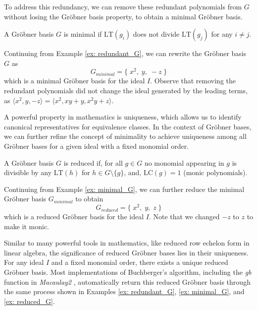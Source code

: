 To address this redundancy, we can remove these redundant polynomials from $G$ without losing the Gröbner basis property, to obtain a minimal Gröbner basis. 

\begin{definition}
\label{def:minimal_grobner_basis}
A Gröbner basis $G$ is minimal if $\text{LT}(g_i)$ does not divide $\text{LT}(g_j)$ for any $i \neq j$.
\end{definition}

\begin{example}
\label{ex: minimal_G}
Continuing from Example \ref{ex: redundant_G}, we can rewrite the Gröbner basis $G$ as
$$G_{minimal} = \Bigg\{ \; x^2, \; y ,\; -z \; \Bigg\}$$
which is a minimal Gröbner basis for the ideal $I$. Observe that removing the redundant polynomials did not change the ideal generated by the leading terms, as $\langle x^2, y, -z \rangle = \langle x^2, xy + y, x^2 y + z \rangle$.
\end{example}

A powerful property in mathematics is uniqueness, which allows us to identify canonical representatives for equivalence classes. In the context of Gröbner bases, we can further refine the concept of minimality to achieve uniqueness among all Gröbner bases for a given ideal with a fixed monomial order.

\begin{definition}
\label{def:reduced_grobner_basis}
A Gröbner basis $G$ is reduced if, for all $g \in G$ no monomial appearing in $g$ is divisible by any $\text{LT}(h)$ for $h \in G \setminus \{g\}$, and, $\text{LC}(g) = 1$ (monic polynomials).
\end{definition}

\begin{example}
\label{ex: reduced_G}
Continuing from Example \ref{ex: minimal_G}, we can further reduce the minimal Gröbner basis $G_{minimal}$ to obtain
$$G_{reduced} = \Bigg\{ \; x^2, \; y ,\; z \; \Bigg\}$$
which is a reduced Gröbner basis for the ideal $I$. Note that we changed $-z$ to $z$ to make it monic.
\end{example}

Similar to many powerful tools in mathematics, like reduced row echelon form in linear algebra, the significance of reduced Gröbner bases lies in their uniqueness. For any ideal $I$ and a fixed monomial order, there exists a unique reduced Gröbner basis. Most implementations of Buchberger's algorithm, including the \textit{gb} function in \textit{Macaulay2} \cite{Stillman_M2}, automatically return this reduced Gröbner basis through the same process shown in Examples \ref{ex: redundant_G}, \ref{ex: minimal_G}, and \ref{ex: reduced_G}.


